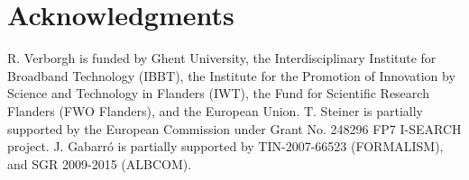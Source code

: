 \documentclass{acm_proc_article-sp}
\begin{document}

\section{Acknowledgments} %
R. Verborgh is funded by Ghent University, the Interdisciplinary Institute for Broadband Technology (IBBT), the Institute for the Promotion of Innovation by Science and Technology in Flanders (IWT), the Fund for Scientific Research Flanders (FWO Flanders), and the European Union.
T. Steiner is partially supported by the European Commission under Grant No. 248296 FP7 \mbox{I-SEARCH} project.
J. Gabarr\'o is partially supported by TIN-2007-66523 (FORMALISM), and SGR 2009-2015 (\mbox{ALBCOM}).




\balancecolumns
\end{document}
